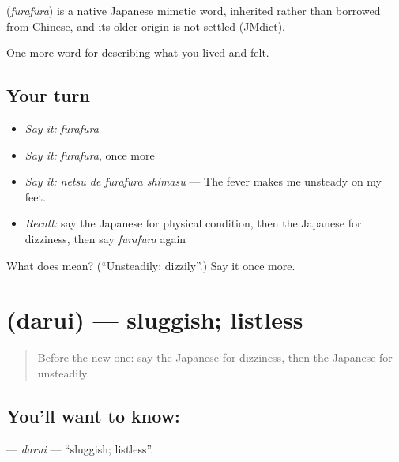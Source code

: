 \begin{cousinweb}
\textbf{} (\emph{furafura}) is a native Japanese mimetic word, inherited rather than borrowed from Chinese, and its older origin is not settled (JMdict).
\end{cousinweb}

\begin{grammarlens}[title={What you've built}]
One more word for describing what you lived and felt.
\end{grammarlens}

\subsection*{Your turn}
\begin{itemize}
\raggedright
  \item \emph{Say it:} \emph{furafura}
  \item \emph{Say it:} \emph{furafura}, once more
  \item \emph{Say it:} \emph{netsu de furafura shimasu} — The fever makes me unsteady on my feet.
  \item \emph{Recall:} say the Japanese for physical condition, then the Japanese for dizziness, then say \emph{furafura} again
\end{itemize}

\begin{tcolorbox}[breakable,colback=teal!4,colframe=teal!35!black,title={Before you move on}]
What does  mean? (\textquotedblleft{}Unsteadily; dizzily\textquotedblright{}.) Say it once more.
\end{tcolorbox}
\section[\texorpdfstring{\ja{だるい} (darui)}{だるい (darui)}]{ (darui) — sluggish; listless}

\label{lesson:JA-C447-darui}



\begin{quote}
Before the new one: say the Japanese for dizziness, then the Japanese for unsteadily.
\end{quote}

\subsection*{You'll want to know: }
\textbf{} — \emph{darui} — \textquotedblleft{}sluggish; listless\textquotedblright{}.

